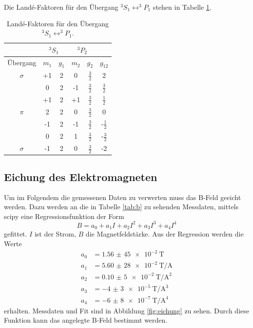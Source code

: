   Die Landé-Faktoren für den Übergang $^3S_1\leftrightarrow ^3\!\!P_1$ stehen in Tabelle \ref{tab:Lande_blau}.

  \begin{table}
  \caption{Landé-Faktoren für den Übergang $^3S_1\leftrightarrow ^3\!\!P_1$.} %
	\label{tab:Lande_blau}
	\centering
  \renewcommand{\arraystretch}{1.2}
  \begin{tabular}{cccccc}
		\toprule
    & \multicolumn{2}{c}{${}^3S_1$}  & \multicolumn{2}{c}{${}^3P_2$} \\
		\midrule
    Übergang & $m_1$  & $g_{1}$ & $m_2$ & $ g_2$ & $g_{12}$\\
		\midrule
		$\sigma$ & +1 & 2 & 0 & $\frac{3}{2}$& 2\\
		& 0 & 2 & -1 & $\frac{3}{2}$ & $\frac{3}{2}$\\
		\midrule
		& +1 & 2 & +1 & $\frac{3}{2}$ & $\frac{1}{2}$\\
		$\pi$ & 2 & 2 & 0 & $\frac{3}{2}$ & 0 \\
		& -1 & 2 & -1 & $\frac{3}{2}$ & -$\frac{1}{2}$\\
		\midrule
		& 0 & 2 & 1 & $\frac{3}{2}$ & -$\frac{3}{2}$\\
		$\sigma$ & -1 & 2 & 0 & $\frac{3}{2}$& -2\\
		\bottomrule
	\end{tabular}
\end{table}
\FloatBarrier
\subsection{Eichung des Elektromagneten}
Um im Folgendem die gemessenen Daten zu verwerten muss das B-Feld geeicht werden.
Dazu werden an die in Tabelle \ref{tab:b} zu sehenden Messdaten, mittels scipy \cite{scipy} eine Regressionsfunktion der Form 
\begin{equation*}
B = a_0 + a_1I + a_2I^2 + a_3I^3 + a_4I^4
\end{equation*}
gefittet.
$I$ ist der Strom, $B$ die Magnetfeldstärke.
Aus der Regression werden die Werte
\begin{align*}
a_0&=\SI{1,56(45)e-2}{\tesla}\\
a_1&=\SI{5,60(28)e-2}{\tesla\per\ampere}\\
a_2&=\SI{0,10(5)e-2}{\tesla\per\ampere\squared}\\
a_3&=\SI{-4(3)e-5}{\tesla\per\ampere\cubed}\\
a_4&=\SI{-6(8)e-7}{\tesla\per\ampere\tothe{4}}
\end{align*}
erhalten.
Messdaten und Fit sind in Abbildung \ref{fig:eichung} zu sehen.
Durch diese Funktion kann das angelegte B-Feld bestimmt werden.

